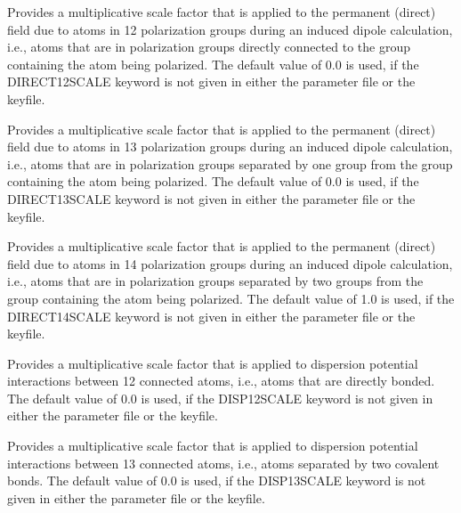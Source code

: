 \documentclass[letterpaper,11pt,english]{sphinxmanual}
\begin{document}
  Provides a multiplicative scale factor that is applied to the permanent (direct) field due to atoms in 1\sphinxhyphen{}2 polarization groups during an induced dipole calculation, i.e., atoms that are in polarization groups directly connected to the group containing the atom being polarized. The default value of 0.0 is used, if the DIRECT\sphinxhyphen{}12\sphinxhyphen{}SCALE keyword is not given in either the parameter file or the keyfile.

  Provides a multiplicative scale factor that is applied to the permanent (direct) field due to atoms in 1\sphinxhyphen{}3 polarization groups during an induced dipole calculation, i.e., atoms that are in polarization groups separated by one group from the group containing the atom being polarized. The default value of 0.0 is used, if the DIRECT\sphinxhyphen{}13\sphinxhyphen{}SCALE keyword is not given in either the parameter file or the keyfile.

  Provides a multiplicative scale factor that is applied to the permanent (direct) field due to atoms in 1\sphinxhyphen{}4 polarization groups during an induced dipole calculation, i.e., atoms that are in polarization groups separated by two groups from the group containing the atom being polarized. The default value of 1.0 is used, if the DIRECT\sphinxhyphen{}14\sphinxhyphen{}SCALE keyword is not given in either the parameter file or the keyfile.





  Provides a multiplicative scale factor that is applied to dispersion potential interactions between 1\sphinxhyphen{}2 connected atoms, i.e., atoms that are directly bonded. The default value of 0.0 is used, if the DISP\sphinxhyphen{}12\sphinxhyphen{}SCALE keyword is not given in either the parameter file or the keyfile.

  Provides a multiplicative scale factor that is applied to dispersion potential interactions between 1\sphinxhyphen{}3 connected atoms, i.e., atoms separated by two covalent bonds. The default value of 0.0 is used, if the DISP\sphinxhyphen{}13\sphinxhyphen{}SCALE keyword is not given in either the parameter file or the keyfile.
\end{document}
